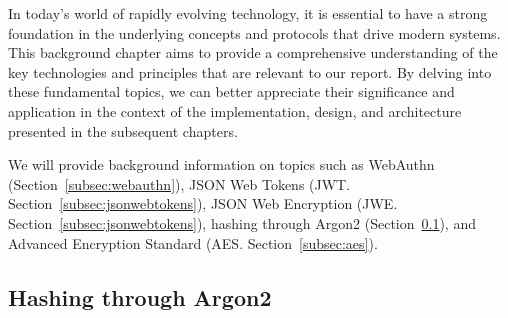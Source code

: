 
In today's world of rapidly evolving technology, it is essential to have a
strong foundation in the underlying concepts and protocols that drive modern
systems.
This background chapter aims to provide a comprehensive understanding of the key
technologies and principles that are relevant to our report.
By delving into these fundamental topics, we can better appreciate their
significance and application in the context of the implementation, design, and
architecture presented in the subsequent chapters.


We will provide background information on topics such as WebAuthn
(Section~\ref{subsec:webauthn}), JSON Web Tokens (JWT\@.
Section~\ref{subsec:jsonwebtokens}), JSON Web Encryption (JWE\@.
Section~\ref{subsec:jsonwebtokens}), hashing through Argon2
(Section~\ref{subsec:hashing-through-argon2}), and Advanced Encryption Standard
(AES. Section~\ref{subsec:aes}).

\subsection{Hashing through Argon2}\label{subsec:hashing-through-argon2}

